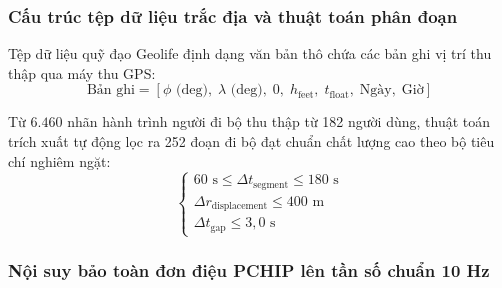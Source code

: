 \subsubsection{Cấu trúc tệp dữ liệu trắc địa và thuật toán phân đoạn}

\hspace{0.5cm} Tệp dữ liệu quỹ đạo Geolife định dạng văn bản thô chứa các bản ghi vị trí thu thập qua máy thu GPS:
\begin{equation}
\text{Bản ghi} = [\phi\text{ (deg)}, \; \lambda\text{ (deg)}, \; 0, \; h_{\text{feet}}, \; t_{\text{float}}, \; \text{Ngày}, \; \text{Giờ}]
\label{eq:geolife-raw-record-format}
\end{equation}

Từ $6.460$ nhãn hành trình người đi bộ thu thập từ 182 người dùng, thuật toán trích xuất tự động lọc ra 252 đoạn đi bộ đạt chuẩn chất lượng cao theo bộ tiêu chí nghiêm ngặt:
\begin{equation}
\begin{cases}
60\text{ s} \le \Delta t_{\text{segment}} \le 180\text{ s} \\
\Delta r_{\text{displacement}} \le 400\text{ m} \\
\Delta t_{\text{gap}} \le 3{,}0\text{ s}
\end{cases}
\label{eq:geolife-filtering-criteria}
\end{equation}

\begin{table}[H]
\centering
\caption{Thống kê đặc tính động học của 252 đoạn đi bộ Geolife được trích xuất}
\label{tab:geolife-segments-statistics}
\end{table}

\subsubsection{Nội suy bảo toàn đơn điệu PCHIP lên tần số chuẩn 10 Hz}

